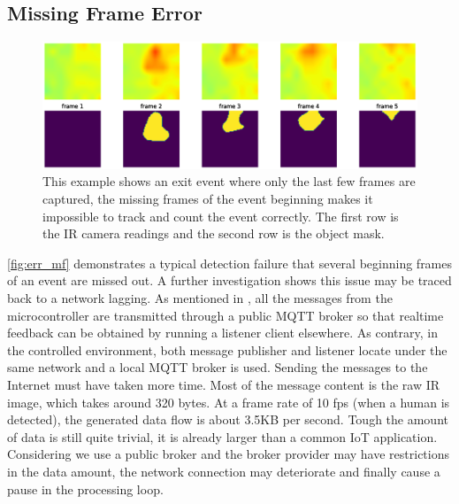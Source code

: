 \subsection{Missing Frame Error}
\begin{figure}
  \centering
  \includegraphics[width=\textwidth]{figures/err_missingframe.eps}
  \caption{This example shows an exit event where only the last few frames are captured, the missing frames of the event beginning makes it impossible to track and count the event correctly. The first row is the IR camera readings and the second row is the object mask.}\label{fig:err_mf}
\end{figure}
\autoref{fig:err_mf} demonstrates a typical detection failure that several beginning frames of an event are missed out. A further investigation shows this issue may be traced back to a network lagging. As mentioned in , all the messages from the microcontroller are transmitted through a public MQTT broker so that realtime feedback can be obtained by running a listener client elsewhere. As contrary, in the controlled environment, both message publisher and listener locate under the same network and a local MQTT broker is used. Sending the messages to the Internet must have taken more time. Most of the message content is the raw IR image, which takes around 320 bytes. At a frame rate of 10 fps (when a human is detected), the generated data flow is about 3.5KB per second. Tough the amount of data is still quite trivial, it is already larger than a common IoT application. Considering we use a public broker and the broker provider may have restrictions in the data amount, the network connection may deteriorate and finally cause a pause in the processing loop.

